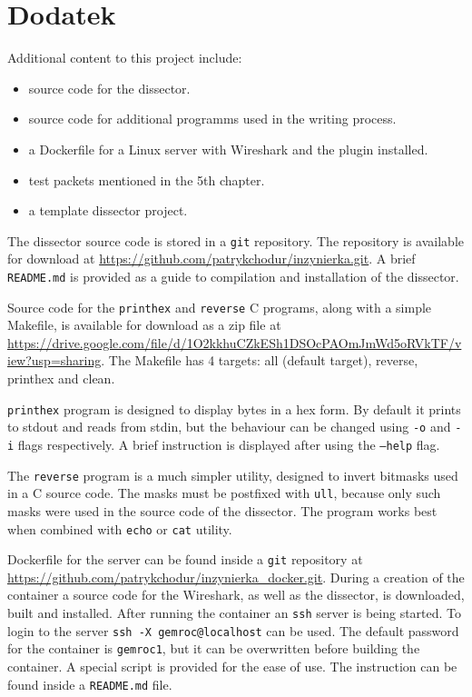 \documentclass[a4paper, 11pt, twoside, openright]{article}
\begin{document}
\cleardoublepage
\section*{Dodatek}

	\indent\par
	Additional content to this project include:
	\begin{itemize}
		\item source code for the dissector.
		\item source code for additional programms used in the writing process.
		\item a Dockerfile for a Linux server with Wireshark and the plugin installed.
		\item test packets mentioned in the 5th chapter.
		\item a template dissector project.
	\end{itemize}


	The dissector source code is stored in a \texttt{git} repository. The repository is available for download
	at \url{https://github.com/patrykchodur/inzynierka.git}. A brief \texttt{README.md} is provided as a guide
	to compilation and installation of the dissector.

	Source code for the \texttt{printhex} and \texttt{reverse} C programs, along with a simple Makefile, is available for download as
	a zip file at \url{https://drive.google.com/file/d/1O2kkhuCZkESh1DSOcPAOmJmWd5oRVkTF/view?usp=sharing}. The Makefile has 4 targets:
	all (default target), reverse, printhex and clean.

	\texttt{printhex} program is designed to display bytes in a hex form. By default it prints to stdout and reads from stdin, but the
	behaviour can be changed using \texttt{-o} and \texttt{-i} flags respectively. A brief instruction is displayed after using the \texttt{--help} flag.

	The \texttt{reverse} program is a much simpler utility, designed to invert bitmasks used in a C source code. The masks must be postfixed with \texttt{ull},
	because only such masks were used in the source code of the dissector. The program works best when combined with \texttt{echo} or \texttt{cat} utility.

	Dockerfile for the server can be found inside a \texttt{git} repository at \url{https://github.com/patrykchodur/inzynierka_docker.git}. During a creation
	of the container a source code for the Wireshark, as well as the dissector, is downloaded, built and installed. After running the container an \texttt{ssh}
	server is being started. To login to the server \texttt{ssh -X gemroc@localhost} can be used. The default password for the container is \texttt{gemroc1}, but
	it can be overwritten before building the container. A special script is provided for the ease of use. The instruction can be found inside a \texttt{README.md} file.
\end{document}
